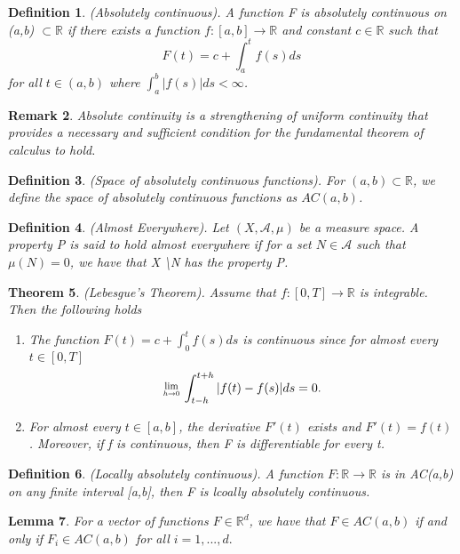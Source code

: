 \documentclass[twoside]{article}
\newcounter{lecnum}
\newcommand{\Lim}[1]{\raisebox{0.5ex}{\scalebox{0.8}{$\displaystyle \lim_{#1}\;$}}}
\newtheorem{theorem}{Theorem}[lecnum]
\newtheorem{lemma}[theorem]{Lemma}
\newtheorem{remark}[theorem]{Remark}
\newtheorem{definition}[theorem]{Definition}
\begin{document}
\begin{definition}(Absolutely continuous). A function F is absolutely continuous on (a,b) $\subset \mathbb{R}$ if there exists a function $f:[a,b] \rightarrow \mathbb{R}$ and constant $c \in \mathbb{R}$ such that 
$$
F(t) = c + \int_a^tf(s)ds
$$
for all $t \in (a,b)$ where $\int_a^b|f(s)|ds < \infty$.
\end{definition}

\begin{remark}Absolute continuity is a strengthening of uniform continuity that provides a necessary and sufficient condition for the fundamental theorem of calculus to hold.
\end{remark}

\begin{definition}(Space of absolutely continuous functions). For $(a,b) \subset \mathbb{R}$, we define the space of absolutely continuous functions as $AC(a,b)$.
\end{definition}

\begin{definition}(Almost Everywhere). Let $(X, \mathcal{A}, \mu)$ be a measure space. A property P is said to hold almost everywhere if for a set $N \in \mathcal{A}$ such that $\mu(N) = 0$, we have that X \textbackslash N has the property P.
\end{definition}

\begin{theorem}(Lebesgue's Theorem). Assume that $f: [0,T] \rightarrow \mathbb{R}$ is integrable. Then the following holds
\begin{enumerate}
\item The function $F(t) = c + \int_0^tf(s)ds$ is continuous since for almost every $t \in [0,T]$
$$
\Lim{h \rightarrow 0}\int_{t-h}^{t+h}|f(t) - f(s)|ds = 0.
$$

\item For almost every $t \in [a,b]$, the derivative $F'(t)$ exists and $F'(t) = f(t)$. Moreover, if f is continuous, then F is differentiable for every t.
\end{enumerate}
\end{theorem}

\begin{definition}(Locally absolutely continuous). A function $F: \mathbb{R} \rightarrow \mathbb{R}$ is in AC(a,b) on any finite interval [a,b], then F is lcoally absolutely continuous.
\end{definition}

\begin{lemma}For a vector of functions $F \in \mathbb{R}^d$, we have that $F \in AC(a,b)$ if and only if $F_i \in AC(a,b)$ for all $i=1,...,d.$
\end{lemma}
\end{document}
